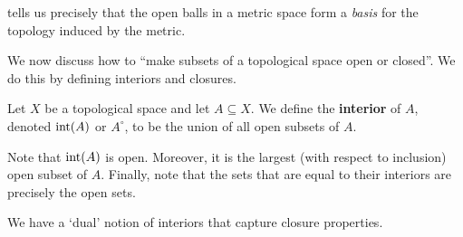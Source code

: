 tells us precisely that the open balls in a metric space form a \textit{basis} for the topology induced by the metric.

We now discuss how to ``make subsets of a topological space open or closed''. We do this by defining interiors and closures.

\begin{boxdefinition}
    Let $X$ be a topological space and let $A \subseteq X$. We define the \textbf{interior} of $A$, denoted $\operatorname{int}\!\left( A \right)$ or $A^{\circ}$, to be the union of all open subsets of $A$.
\end{boxdefinition}

Note that $\operatorname{int}\!\left( A \right)$ is open. Moreover, it is the largest (with respect to inclusion) open subset of $A$. Finally, note that the sets that are equal to their interiors are precisely the open sets.

We have a `dual' notion of interiors that capture closure properties.

